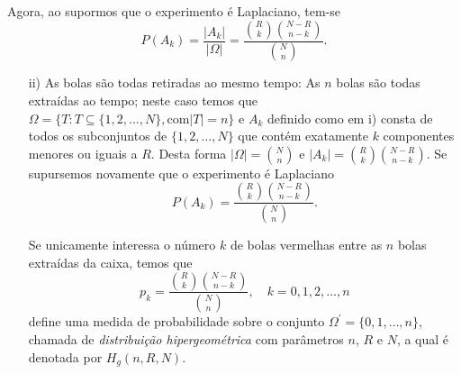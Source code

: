 \begin{frame}
\begin{block}{}
 Agora, ao supormos que o experimento é Laplaciano, tem-se
\begin{equation*}
 P(A_k)=\frac{\left|A_k \right|}{ \left|\Omega\right|}= \displaystyle{\frac{\binom{R}{k} \binom{N-R}{n-k} }{ \binom{N}{n}}} .
\end{equation*}
\begin{enumerate}
\item[ii)] As bolas são todas retiradas ao mesmo tempo: As $n$ bolas são todas extraídas ao tempo; neste caso temos que 
$\Omega =\{T:T \subseteq\{1,2,\ldots,N \}, \text{com}  \left|T\right|=n\}$ e $A_k$ definido como em i) consta de
todos os subconjuntos de  $\{1,2,  \dots ,N\}$ que contém  exatamente $k$ componentes menores ou iguais a $R$. Desta
forma  $\left| \Omega\right|= \binom{N}{n} $  e $\left| A_k\right|= \binom{R}{k} \binom{N-R}{n-k}.$ Se supursemos novamente que o experimento é Laplaciano 
\begin{equation*} 
\displaystyle{P(A_k)=\frac{\binom{R}{k} \binom{N-R}{n-k} } { \binom{N}{n}}}.
\end{equation*}

Se unicamente interessa o número $k$ de bolas vermelhas entre as $n$
bolas extraídas da caixa, temos que
\begin{equation*} 
\displaystyle{p_k= \frac{\binom{R}{k} \binom{N-R}{n-k}}{
\binom{N}{n}}  , \quad k = 0,1,2, \dots , n}
\end{equation*} 
define uma medida de probabilidade sobre o conjunto $\Omega^\prime=\{0,1, \dots  , n\} $, chamada de \textit{distribuição
hipergeométrica} com parâmetros $n$, $R$ e $N$, a qual é denotada por $H_g (n,R,N)$. 
\end{enumerate}
\end{block}
\end{frame}

